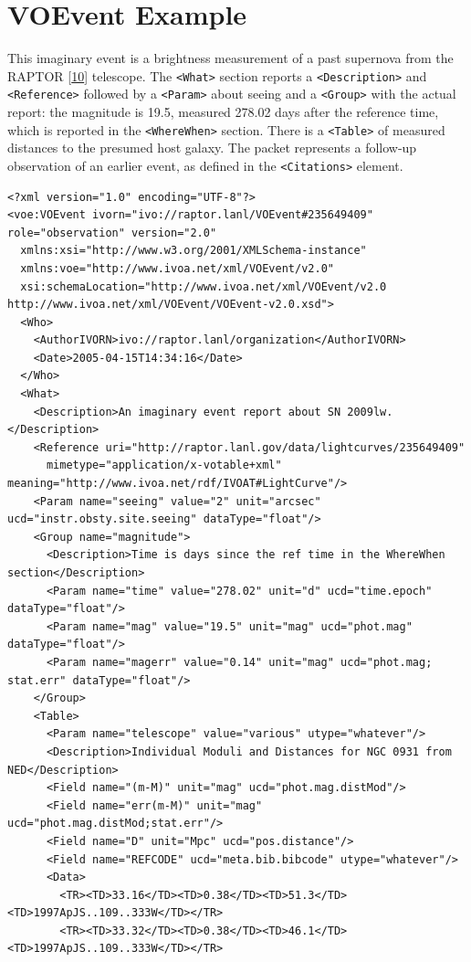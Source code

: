 \documentclass[11pt,a4paper]{ivoa}
\begin{document}
\section{VOEvent Example}
\label{sec:4}
This imaginary event is a brightness measurement of a past supernova from the RAPTOR [\hyperref[bib10]{10}] telescope. The {\tt <What>} section reports a {\tt <Description>} and {\tt <Reference>} followed by a {\tt <Param>} about seeing and a {\tt <Group>} with the actual report: the magnitude is 19.5, measured 278.02 days after the reference time, which is reported in the {\tt <WhereWhen>} section. There is a {\tt <Table>} of measured distances to the presumed host galaxy. The packet represents a follow-up observation of an earlier event, as defined in the {\tt <Citations>} element. 
{\footnotesize
\begin{verbatim}
<?xml version="1.0" encoding="UTF-8"?>
<voe:VOEvent ivorn="ivo://raptor.lanl/VOEvent#235649409" role="observation" version="2.0"
  xmlns:xsi="http://www.w3.org/2001/XMLSchema-instance"
  xmlns:voe="http://www.ivoa.net/xml/VOEvent/v2.0"
  xsi:schemaLocation="http://www.ivoa.net/xml/VOEvent/v2.0     http://www.ivoa.net/xml/VOEvent/VOEvent-v2.0.xsd">
  <Who>
    <AuthorIVORN>ivo://raptor.lanl/organization</AuthorIVORN>
    <Date>2005-04-15T14:34:16</Date>
  </Who>
  <What>
    <Description>An imaginary event report about SN 2009lw.</Description>
    <Reference uri="http://raptor.lanl.gov/data/lightcurves/235649409"
      mimetype="application/x-votable+xml" meaning="http://www.ivoa.net/rdf/IVOAT#LightCurve"/>
    <Param name="seeing" value="2" unit="arcsec" ucd="instr.obsty.site.seeing" dataType="float"/>
    <Group name="magnitude">
      <Description>Time is days since the ref time in the WhereWhen section</Description>
      <Param name="time" value="278.02" unit="d" ucd="time.epoch" dataType="float"/>
      <Param name="mag" value="19.5" unit="mag" ucd="phot.mag" dataType="float"/>
      <Param name="magerr" value="0.14" unit="mag" ucd="phot.mag; stat.err" dataType="float"/>
    </Group>
    <Table>
      <Param name="telescope" value="various" utype="whatever"/>
      <Description>Individual Moduli and Distances for NGC 0931 from NED</Description>
      <Field name="(m-M)" unit="mag" ucd="phot.mag.distMod"/>
      <Field name="err(m-M)" unit="mag" ucd="phot.mag.distMod;stat.err"/>
      <Field name="D" unit="Mpc" ucd="pos.distance"/>
      <Field name="REFCODE" ucd="meta.bib.bibcode" utype="whatever"/>
      <Data>
        <TR><TD>33.16</TD><TD>0.38</TD><TD>51.3</TD><TD>1997ApJS..109..333W</TD></TR>
        <TR><TD>33.32</TD><TD>0.38</TD><TD>46.1</TD><TD>1997ApJS..109..333W</TD></TR>

\end{verbatim}}
\end{document}
